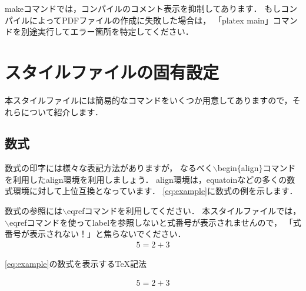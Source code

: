 makeコマンドでは，コンパイルのコメント表示を抑制してあります．
もしコンパイルによってPDFファイルの作成に失敗した場合は，
「platex main」コマンドを別途実行してエラー箇所を特定してください．
\section{スタイルファイルの固有設定}
\label{sec:master}
本スタイルファイルには簡易的なコマンドをいくつか用意してありますので，それらについて紹介します．

\subsection{数式}
数式の印字には様々な表記方法がありますが，
なるべく$\backslash$begin$\{$align$\}$コマンドを利用したalign環境を利用しましょう．
align環境は，equatoinなどの多くの数式環境に対して上位互換となっています．
\eqref{eq:example}に数式の例を示します．

数式の参照には$\backslash$eqrefコマンドを利用してください．
本スタイルファイルでは，
$\backslash$eqrefコマンドを使ってlabelを参照しないと式番号が表示されませんので，
「式番号が表示されない！」と焦らないでください．
%
\begin{align}
	5 = 2 + 3
	\label{eq:example}
\end{align}
%
\begin{lstbox}{\eqref{eq:example}の数式を表示するTeX記法}
\begin{minilst}
\begin{align}
	5 = 2 + 3
	\label{eq:1}
\end{align}
\end{minilst}
\end{lstbox}
